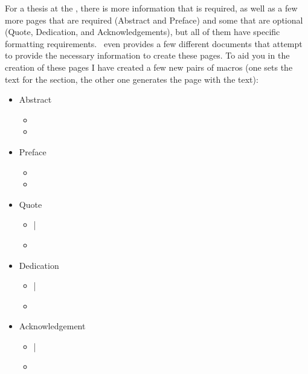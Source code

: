 		For a thesis at the \University, there is more information that is required, as well as a few more pages that are required (Abstract and Preface) and some that are optional (Quote, Dedication, and Acknowledgements), but all of them have specific formatting requirements.
		\Fac\ even provides a few different documents that attempt to provide the necessary information to create these pages\cite{FGPS2024}.
		To aid you in the creation of these pages I have created a few new pairs of macros (one sets the text for the section, the other one generates the page with the text):
		\begin{itemize}
			\item Abstract
				\begin{itemize}
					\item {}
					\item {}
				\end{itemize}
			\item Preface
				\begin{itemize}
					\item {}
					\item {}
				\end{itemize}
			\item Quote
				\begin{itemize}
					\item {}|
					\item {}
				\end{itemize}
			\item Dedication
				\begin{itemize}
					\item {}|
					\item {}
				\end{itemize}
			\item Acknowledgement
				\begin{itemize}
					\item {}|
					\item {}
				\end{itemize}
		\end{itemize}

